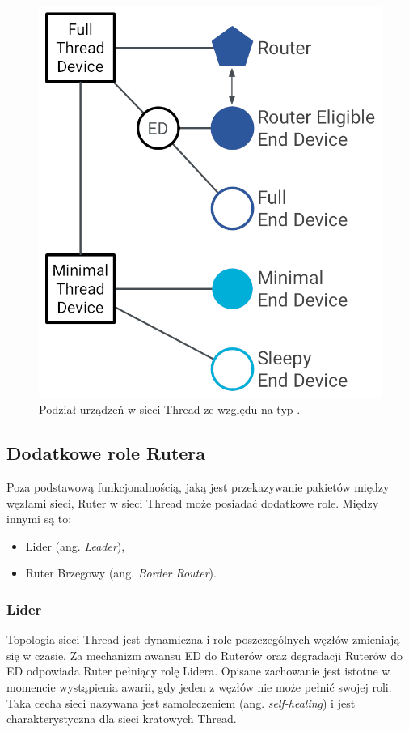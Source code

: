         \begin{figure}[H]
            \centering
            \includegraphics[width=0.8\linewidth]{graphics/external/ot-primer-taxonomy.png}
            \caption{Podział urządzeń w sieci Thread ze względu na typ \cite{ot-devices}.}
            \label{fig:thread-device-taxonomy}
        \end{figure}

    \subsection{Dodatkowe role Rutera}

        Poza podstawową funkcjonalnością, jaką jest przekazywanie pakietów między węzłami sieci, Ruter w sieci Thread może posiadać dodatkowe role. Między innymi są to:
        \begin{itemize}
            \item Lider (ang. \textit{Leader}),
            \item Ruter Brzegowy (ang. \textit{Border Router}).
        \end{itemize}

        \subsubsection{Lider}

        Topologia sieci Thread jest dynamiczna i role poszczególnych węzłów zmieniają się w czasie. Za mechanizm awansu ED do Ruterów oraz degradacji Ruterów do ED odpowiada Ruter pełniący rolę Lidera. Opisane zachowanie jest istotne w momencie wystąpienia awarii, gdy jeden z węzłów nie może pełnić swojej roli. Taka cecha sieci nazywana jest samoleczeniem (ang. \textit{self-healing}) i jest charakterystyczna dla sieci kratowych Thread.

